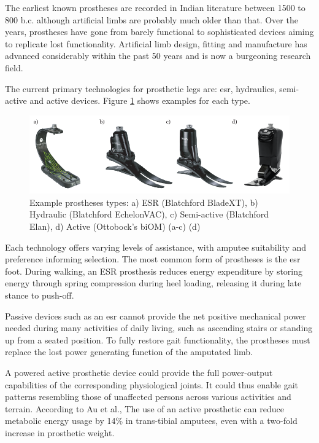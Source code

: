 The earliest known prostheses are recorded in Indian literature between 1500 to 800 b.c. although artificial limbs are probably much older than that\cite{Breakey1976}. Over the years, prostheses have gone from barely functional to sophisticated devices aiming to replicate lost functionality. Artificial limb design, fitting and manufacture has advanced considerably within the past 50 years and is now a burgeoning research field.\cite{Kirkup2007}

The current primary technologies for prosthetic legs are: \acrfull{esr}, hydraulics, semi-active and active devices\cite{Asif2021}. Figure \ref{Fig:CH2-prostheses_type} shows examples for each type.

\begin{figure}[!hbt]
\centering
  \includegraphics[width=\textwidth]{content/2-Background/ch2_prosthetic_device_types.pdf}
  \caption[Example prostheses types]{Example prostheses types: a) ESR (Blatchford BladeXT), b) Hydraulic (Blatchford EchelonVAC), c) Semi-active (Blatchford Elan), d) Active (Ottobock's biOM) (a-c)\cite{blatchford2018} (d)\cite{biom2018} }
  \label{Fig:CH2-prostheses_type}
\end{figure}

Each technology offers varying levels of assistance, with amputee suitability and preference informing selection. The most common form of prostheses is the \acrshort{esr} foot. During walking, an ESR prosthesis reduces energy expenditure by storing energy through spring compression during heel loading, releasing it during late stance to push-off.\cite{Asif2021}

Passive devices such as an \acrshort{esr} cannot provide the net positive mechanical power needed during many activities of daily living, such as ascending stairs or standing up from a seated position\cite{Simon2013}. To fully restore gait functionality, the prostheses must replace the lost power generating function of the amputated limb.

A powered active prosthetic device could provide the full power-output capabilities of the corresponding physiological joints. It could thus enable gait patterns resembling those of unaffected persons across various activities and terrain\cite{Tucker2015, Bhakta2020}. According to Au et al., The use of an active prosthetic can reduce metabolic energy usage by 14\% in trans-tibial amputees, even with a two-fold increase in prosthetic weight\cite{Au2009}.

